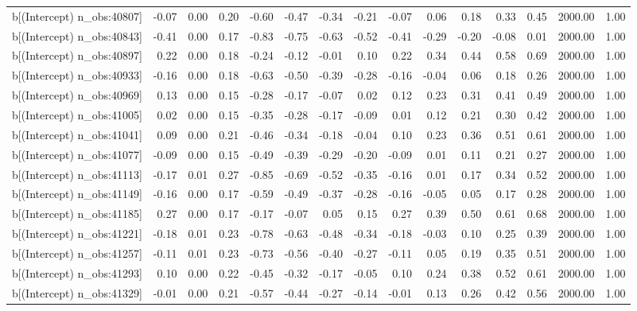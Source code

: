 \begin{table}[ht]
\begin{tabular}{rrrrrrrrrrrrrrr}
  b[(Intercept) n\_obs:40807] & -0.07 & 0.00 & 0.20 & -0.60 & -0.47 & -0.34 & -0.21 & -0.07 & 0.06 & 0.18 & 0.33 & 0.45 & 2000.00 & 1.00 \\ 
  b[(Intercept) n\_obs:40843] & -0.41 & 0.00 & 0.17 & -0.83 & -0.75 & -0.63 & -0.52 & -0.41 & -0.29 & -0.20 & -0.08 & 0.01 & 2000.00 & 1.00 \\ 
  b[(Intercept) n\_obs:40897] & 0.22 & 0.00 & 0.18 & -0.24 & -0.12 & -0.01 & 0.10 & 0.22 & 0.34 & 0.44 & 0.58 & 0.69 & 2000.00 & 1.00 \\ 
  b[(Intercept) n\_obs:40933] & -0.16 & 0.00 & 0.18 & -0.63 & -0.50 & -0.39 & -0.28 & -0.16 & -0.04 & 0.06 & 0.18 & 0.26 & 2000.00 & 1.00 \\ 
  b[(Intercept) n\_obs:40969] & 0.13 & 0.00 & 0.15 & -0.28 & -0.17 & -0.07 & 0.02 & 0.12 & 0.23 & 0.31 & 0.41 & 0.49 & 2000.00 & 1.00 \\ 
  b[(Intercept) n\_obs:41005] & 0.02 & 0.00 & 0.15 & -0.35 & -0.28 & -0.17 & -0.09 & 0.01 & 0.12 & 0.21 & 0.30 & 0.42 & 2000.00 & 1.00 \\ 
  b[(Intercept) n\_obs:41041] & 0.09 & 0.00 & 0.21 & -0.46 & -0.34 & -0.18 & -0.04 & 0.10 & 0.23 & 0.36 & 0.51 & 0.61 & 2000.00 & 1.00 \\ 
  b[(Intercept) n\_obs:41077] & -0.09 & 0.00 & 0.15 & -0.49 & -0.39 & -0.29 & -0.20 & -0.09 & 0.01 & 0.11 & 0.21 & 0.27 & 2000.00 & 1.00 \\ 
  b[(Intercept) n\_obs:41113] & -0.17 & 0.01 & 0.27 & -0.85 & -0.69 & -0.52 & -0.35 & -0.16 & 0.01 & 0.17 & 0.34 & 0.52 & 2000.00 & 1.00 \\ 
  b[(Intercept) n\_obs:41149] & -0.16 & 0.00 & 0.17 & -0.59 & -0.49 & -0.37 & -0.28 & -0.16 & -0.05 & 0.05 & 0.17 & 0.28 & 2000.00 & 1.00 \\ 
  b[(Intercept) n\_obs:41185] & 0.27 & 0.00 & 0.17 & -0.17 & -0.07 & 0.05 & 0.15 & 0.27 & 0.39 & 0.50 & 0.61 & 0.68 & 2000.00 & 1.00 \\ 
  b[(Intercept) n\_obs:41221] & -0.18 & 0.01 & 0.23 & -0.78 & -0.63 & -0.48 & -0.34 & -0.18 & -0.03 & 0.10 & 0.25 & 0.39 & 2000.00 & 1.00 \\ 
  b[(Intercept) n\_obs:41257] & -0.11 & 0.01 & 0.23 & -0.73 & -0.56 & -0.40 & -0.27 & -0.11 & 0.05 & 0.19 & 0.35 & 0.51 & 2000.00 & 1.00 \\ 
  b[(Intercept) n\_obs:41293] & 0.10 & 0.00 & 0.22 & -0.45 & -0.32 & -0.17 & -0.05 & 0.10 & 0.24 & 0.38 & 0.52 & 0.61 & 2000.00 & 1.00 \\ 
  b[(Intercept) n\_obs:41329] & -0.01 & 0.00 & 0.21 & -0.57 & -0.44 & -0.27 & -0.14 & -0.01 & 0.13 & 0.26 & 0.42 & 0.56 & 2000.00 & 1.00 \\ 

\end{tabular}
\end{table}
